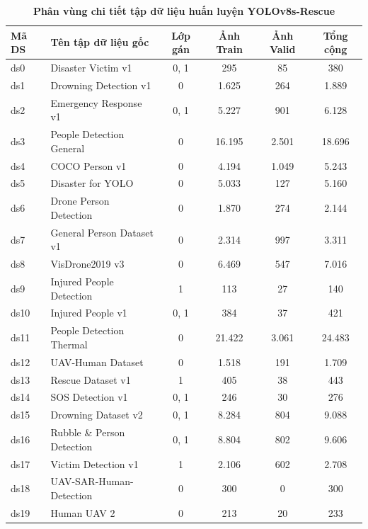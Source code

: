 \begin{table}[H]
    \centering
    \caption[Phân vùng chi tiết tập dữ liệu huấn luyện YOLOv8s-Rescue]{\bfseries\fontsize{12pt}{0pt}\selectfont Phân vùng chi tiết tập dữ liệu huấn luyện YOLOv8s-Rescue}
    \begin{tabularx}{\textwidth}{|l|X|c|c|c|c|}
    \hline
    \rowcolor{LightCyan}
    \textbf{Mã DS} & \textbf{Tên tập dữ liệu gốc} & \textbf{Lớp gán} & \textbf{Ảnh Train} & \textbf{Ảnh Valid} & \textbf{Tổng cộng} \\ \hline
    ds0 & Disaster Victim v1 & 0, 1 & 295 & 85 & 380 \\ \hline
    ds1 & Drowning Detection v1 & 0 & 1.625 & 264 & 1.889 \\ \hline
    ds2 & Emergency Response v1 & 0, 1 & 5.227 & 901 & 6.128 \\ \hline
    ds3 & People Detection General & 0 & 16.195 & 2.501 & 18.696 \\ \hline
    ds4 & COCO Person v1 & 0 & 4.194 & 1.049 & 5.243 \\ \hline
    ds5 & Disaster for YOLO & 0 & 5.033 & 127 & 5.160 \\ \hline
    ds6 & Drone Person Detection & 0 & 1.870 & 274 & 2.144 \\ \hline
    ds7 & General Person Dataset v1 & 0 & 2.314 & 997 & 3.311 \\ \hline
    ds8 & VisDrone2019 v3 & 0 & 6.469 & 547 & 7.016 \\ \hline
    ds9 & Injured People Detection & 1 & 113 & 27 & 140 \\ \hline
    ds10 & Injured People v1 & 0, 1 & 384 & 37 & 421 \\ \hline
    ds11 & People Detection Thermal & 0 & 21.422 & 3.061 & 24.483 \\ \hline
    ds12 & UAV-Human Dataset & 0 & 1.518 & 191 & 1.709 \\ \hline
    ds13 & Rescue Dataset v1 & 1 & 405 & 38 & 443 \\ \hline
    ds14 & SOS Detection v1 & 0, 1 & 246 & 30 & 276 \\ \hline
    ds15 & Drowning Dataset v2 & 0, 1 & 8.284 & 804 & 9.088 \\ \hline
    ds16 & Rubble \& Person Detection & 0, 1 & 8.804 & 802 & 9.606 \\ \hline
    ds17 & Victim Detection v1 & 1 & 2.106 & 602 & 2.708 \\ \hline
    ds18 & UAV-SAR-Human-Detection & 0 & 300 & 0 & 300 \\ \hline
    ds19 & Human UAV 2 & 0 & 213 & 20 & 233 \\ \hline

\end{tabularx}
\end{table}
